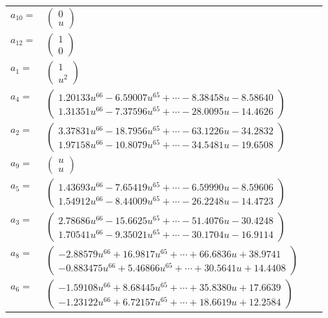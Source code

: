 \documentclass[1p]{elsarticle_modified}
\theoremstyle{definition}
\begin{document}
\begin{tabular}{m{7pt} m{180pt} m{7pt} m{180pt} }
\flushright $a_{10}=$&$\begin{pmatrix}0\\u\end{pmatrix}$ \\
\flushright $a_{12}=$&$\begin{pmatrix}1\\0\end{pmatrix}$ \\
\flushright $a_{1}=$&$\begin{pmatrix}1\\u^2\end{pmatrix}$ \\
\flushright $a_{4}=$&$\begin{pmatrix}1.20133 u^{66}-6.59007 u^{65}+\cdots-8.38458 u-8.58640\\1.31351 u^{66}-7.37596 u^{65}+\cdots-28.0095 u-14.4626\end{pmatrix}$ \\
\flushright $a_{2}=$&$\begin{pmatrix}3.37831 u^{66}-18.7956 u^{65}+\cdots-63.1226 u-34.2832\\1.97158 u^{66}-10.8079 u^{65}+\cdots-34.5481 u-19.6508\end{pmatrix}$ \\
\flushright $a_{9}=$&$\begin{pmatrix}u\\u\end{pmatrix}$ \\
\flushright $a_{5}=$&$\begin{pmatrix}1.43693 u^{66}-7.65419 u^{65}+\cdots-6.59990 u-8.59606\\1.54912 u^{66}-8.44009 u^{65}+\cdots-26.2248 u-14.4723\end{pmatrix}$ \\
\flushright $a_{3}=$&$\begin{pmatrix}2.78686 u^{66}-15.6625 u^{65}+\cdots-51.4076 u-30.4248\\1.70541 u^{66}-9.35021 u^{65}+\cdots-30.1704 u-16.9114\end{pmatrix}$ \\
\flushright $a_{8}=$&$\begin{pmatrix}-2.88579 u^{66}+16.9817 u^{65}+\cdots+66.6836 u+38.9741\\-0.883475 u^{66}+5.46866 u^{65}+\cdots+30.5641 u+14.4408\end{pmatrix}$ \\
\flushright $a_{6}=$&$\begin{pmatrix}-1.59108 u^{66}+8.68445 u^{65}+\cdots+35.8380 u+17.6639\\-1.23122 u^{66}+6.72157 u^{65}+\cdots+18.6619 u+12.2584\end{pmatrix}$ \\

\end{tabular}
\end{document}
